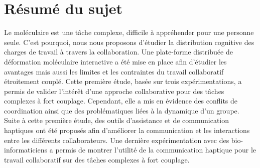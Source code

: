 \documentclass[10pt,myfrancais]{article}
\begin{document}
	\section*{Résumé du sujet}
	Le  moléculaire est une tâche complexe, difficile à appréhender pour une personne seule.
	C'est pourquoi, nous nous proposons d'étudier la distribution cognitive des charges de travail à travers la collaboration.
	Une plate-forme distribuée de déformation moléculaire interactive a été mise en place afin d'étudier les avantages mais aussi les limites et les contraintes du travail collaboratif étroitement couplé.
	Cette première étude, basée sur trois expérimentations, a permis de valider l'intérêt d'une approche collaborative pour des tâches complexes à fort couplage.
	Cependant, elle a mis en évidence des conflits de coordination ainsi que des problématiques liées à la dynamique d'un groupe.
	Suite à cette première étude, des outils d'assistance et de communication haptiques ont été proposés afin d'améliorer la communication et les interactions entre les différents collaborateurs.
	Une dernière expérimentation avec des bio-informaticiens a permis de montrer l'utilité de la communication haptique pour le travail collaboratif sur des tâches complexes à fort couplage.
\end{document}
